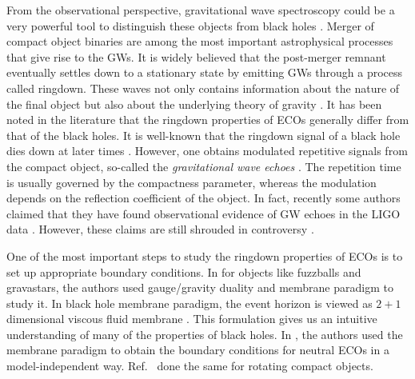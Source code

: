 \documentclass[aps,prd,twocolumn,floatfix,noshowpacs,tightenlines,noshowkeys,superscriptaddress,amsmath,amssymb,
nofootinbib]{revtex4-1}
\renewcommand\[{\begin{equation}}
\renewcommand\]{\end{equation}}
\begin{document}
 From the observational perspective, gravitational wave spectroscopy could be a very powerful tool to distinguish these objects from black holes \cite{Cardoso:2016rao,Maggio:2020jml, Mark:2017dnq, Micchi:2019yze,Micchi:2020gqy}. Merger of compact object binaries are among the most important astrophysical processes that give rise to the GWs. It is widely believed that the post-merger remnant eventually settles down to a stationary state by emitting GWs through a process called ringdown. These waves not only contains information about the nature of the final object but also about the underlying theory of gravity \cite{Cardoso:2016oxy,Yunes:2013dva,Berti:2015itd,TheLIGOScientific:2016src,Yunes:2016jcc,Dey:2020lhq}. It has been noted in the literature that the ringdown properties of ECOs generally differ from that of the black holes. It is well-known that the ringdown signal of a black hole dies down at later times \cite{PhysRevD.34.384,PhysRevD.49.883,PhysRevD.49.890,PhysRevLett.84.10}. However, one obtains modulated repetitive signals from the compact object, so-called the \textit{gravitational wave echoes} \cite{Cardoso:2017cqb,Cardoso:2016rao,Cardoso:2019rvt,Maggio:2020jml, Mark:2017dnq, Micchi:2019yze,Micchi:2020gqy}. The repetition time is usually governed by the compactness parameter, whereas the modulation depends on the reflection coefficient of the object.  In fact, recently some authors claimed that they have found observational evidence of GW echoes in the LIGO data \cite{Conklin:2017lwb,PhysRevD.97.124044,Abedi:2016hgu,Holdom:2019bdv,Conklin:2019fcs}. However, these claims are still shrouded in controversy \cite{Tsang:2019zra, Salemi:2019uea, Uchikata:2019frs, Westerweck:2017hus}.\par
 One of the most important steps to study the ringdown properties of ECOs is to set up appropriate boundary conditions. In \cite{Oshita:2019sat, Wang:2019rcf} for objects like fuzzballs and gravastars, the authors used gauge/gravity duality and membrane paradigm to study it. In black hole membrane paradigm, the event horizon is viewed as $2+1$ dimensional viscous fluid membrane \cite{1982mgm..conf..587D, Thorne, MacDonald:1982zz, PhysRevD.33.915}. This formulation gives us an intuitive understanding of many of the properties of black holes. In \cite{Maggio:2020jml}, the authors used the membrane paradigm to obtain the boundary conditions for neutral ECOs in a model-independent way.  Ref.~\cite{Chen:2020htz} done the same for rotating compact objects.\par
\end{document}
